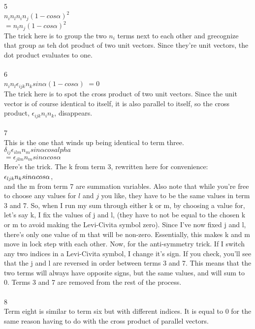 \documentclass[prb,preprint]
{revtex4-1}
\begin{document}
5\\
$n_in_ln_in_j\left(1 - cos\alpha\right)^2$\\
$= n_l n_j \left(1 - cos\alpha\right)^2$\\
The trick here is to group the two $n_i$ terms next to each other and grecognize that group as teh dot product of two unit vectors.  Since they're unit vectors, the dot product evaluates to one.\\\\
6\\
$n_i n_l \epsilon_{ijk} n_k sin\alpha \left(1 - cos\alpha\right)$
$= 0$\\
The trick here is to spot the cross product of two unit vectors.  Since the unit vector is of course identical to itself, it is also parallel to itself, so the cross product, $\epsilon_{ijk}n_i n_k$, disappears.\\\\
7\\
This is the one that winds up being identical to term three.\\
$\delta_{ij} \epsilon_{ilm} n_m sin\alpha cos alpha$\\
$= \epsilon_{jlm} n_m sin \alpha cos \alpha$\\
Here's the trick.  The k from term 3, rewritten here for convenience: \\
$\epsilon_{ljk}n_k\space sin\alpha\space cos\alpha$, \\
and the m from term 7 are summation variables.  Also note that while you're free to choose any values for $l$ and $j$ you like, they have to be the same values in term 3 and 7.  So, when I run my sum through either k or m, by choosing a value for, let's say k, I fix the values of j and l, (they have to not be equal to the chosen k or m to avoid making the Levi-Civita symbol zero).  Since I've now fixed j and l, there's only one value of m that will be non-zero.  Essentially, this makes k and m move in lock step with each other.  Now, for the anti-symmetry trick.  If I switch any two indices in a Levi-Civita symbol, I change it's sign.  If you check, you'll see that the j and l are reversed in order between terms 3 and 7.  This means that the two terms will always have opposite signs, but the same values, and will sum to 0.  Terms 3 and 7 are removed from the rest of the process.\\\\
8\\
Term eight is similar to term six but with different indices.  It is equal to 0 for the same reason having to do with the cross product of parallel vectors.\\\\
\end{document}
